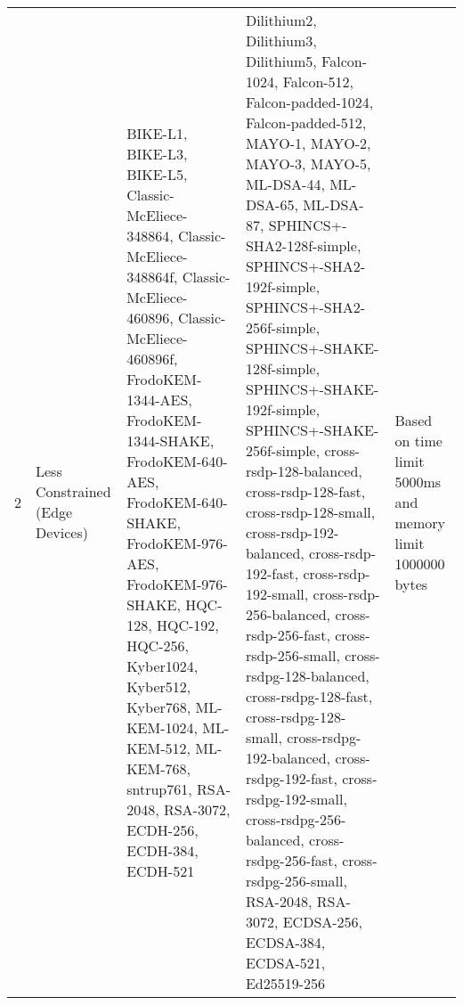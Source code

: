 \begin{longtable}{lllll}
2 & Less Constrained (Edge Devices) & BIKE-L1, BIKE-L3, BIKE-L5, Classic-McEliece-348864, Classic-McEliece-348864f, Classic-McEliece-460896, Classic-McEliece-460896f, FrodoKEM-1344-AES, FrodoKEM-1344-SHAKE, FrodoKEM-640-AES, FrodoKEM-640-SHAKE, FrodoKEM-976-AES, FrodoKEM-976-SHAKE, HQC-128, HQC-192, HQC-256, Kyber1024, Kyber512, Kyber768, ML-KEM-1024, ML-KEM-512, ML-KEM-768, sntrup761, RSA-2048, RSA-3072, ECDH-256, ECDH-384, ECDH-521 & Dilithium2, Dilithium3, Dilithium5, Falcon-1024, Falcon-512, Falcon-padded-1024, Falcon-padded-512, MAYO-1, MAYO-2, MAYO-3, MAYO-5, ML-DSA-44, ML-DSA-65, ML-DSA-87, SPHINCS+-SHA2-128f-simple, SPHINCS+-SHA2-192f-simple, SPHINCS+-SHA2-256f-simple, SPHINCS+-SHAKE-128f-simple, SPHINCS+-SHAKE-192f-simple, SPHINCS+-SHAKE-256f-simple, cross-rsdp-128-balanced, cross-rsdp-128-fast, cross-rsdp-128-small, cross-rsdp-192-balanced, cross-rsdp-192-fast, cross-rsdp-192-small, cross-rsdp-256-balanced, cross-rsdp-256-fast, cross-rsdp-256-small, cross-rsdpg-128-balanced, cross-rsdpg-128-fast, cross-rsdpg-128-small, cross-rsdpg-192-balanced, cross-rsdpg-192-fast, cross-rsdpg-192-small, cross-rsdpg-256-balanced, cross-rsdpg-256-fast, cross-rsdpg-256-small, RSA-2048, RSA-3072, ECDSA-256, ECDSA-384, ECDSA-521, Ed25519-256 & Based on time limit 5000ms and memory limit 1000000 bytes \\
\end{longtable}
